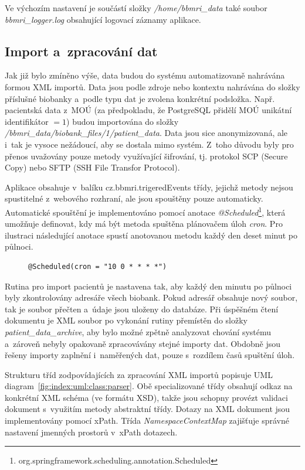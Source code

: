 \documentclass[11pt, final, oneside]{fithesis2}
\begin{document}
Ve výchozím nastavení je součástí složky \textit{/home/bbmri\_data} také soubor \textit{bbmri\_logger.log} obsahující logovací záznamy aplikace. 

\subsection{Import a~zpracování dat}\label{chapter:implementation:subsection:import}
Jak již bylo zmíněno výše, data budou do systému automatizovaně nahrávána formou XML importů. Data jsou podle zdroje nebo kontextu nahrávána do složky příslušné biobanky a~podle typu dat je zvolena konkrétní podsložka. Např. pacientská data z~MOÚ (za předpokladu, že PostgreSQL přidělí MOÚ unikátní identifikátor $= 1$) budou importována do složky \textit{/bbmri\_data/biobank\_files/1/patient\_data}. Data jsou sice anonymizovaná, ale i~tak je vysoce nežádoucí, aby se dostala mimo systém. Z~toho důvodu byly pro přenos uvažovány pouze metody využívající šifrování, tj. protokol SCP (Secure Copy) nebo SFTP (SSH File Transfor Protocol). 

Aplikace obsahuje v~balíku cz.bbmri.trigeredEvents třídy, jejichž metody nejsou spustitelné z~webového rozhraní, ale jsou spouštěny pouze automaticky. Automatické spouštění je implementováno pomocí anotace \textit{@Scheduled}\footnote{org.springframework.scheduling.annotation.Scheduled}, která umožňuje definovat, kdy má být metoda spuštěna plánovačem úloh \textit{cron}. 
Pro ilustraci následující anotace spustí anotovanou metodu každý den deset minut po půlnoci. 
\begin{figure}[h!]
\centering
\begin{BVerbatim}
@Scheduled(cron = "10 0 * * * *")
\end{BVerbatim}
\end{figure}

Rutina pro import pacientů je nastavena tak, aby každý den minutu po půlnoci byly zkontrolovány adresáře všech biobank. Pokud adresář obsahuje nový soubor, tak je soubor přečten a~údaje jsou uloženy do databáze. Při úspěšném čtení dokumentu je XML soubor po vykonání rutiny přemístěn do složky \textit{patient\_data\_archive}, aby bylo možné zpětně analyzovat chování systému a~zároveň nebyly opakovaně zpracovávány stejné importy dat.
Obdobně jsou řešeny importy zaplnění i~naměřených dat, pouze s~rozdílem časů spuštění úloh.

Strukturu tříd zodpovídajících za zpracování XML importů popisuje UML diagram~\ref{fig:index:uml:class:parser}. Obě specializované třídy obsahují odkaz na konkrétní XML schéma (ve formátu XSD), takže jsou schopny provézt validaci dokument s~využitím metody abstraktní třídy. Dotazy na XML dokument jsou implementovány pomocí xPath.
Třída \textit{NamespaceContextMap} zajišťuje správné nastavení jmenných prostorů v~xPath dotazech.
\end{document}
